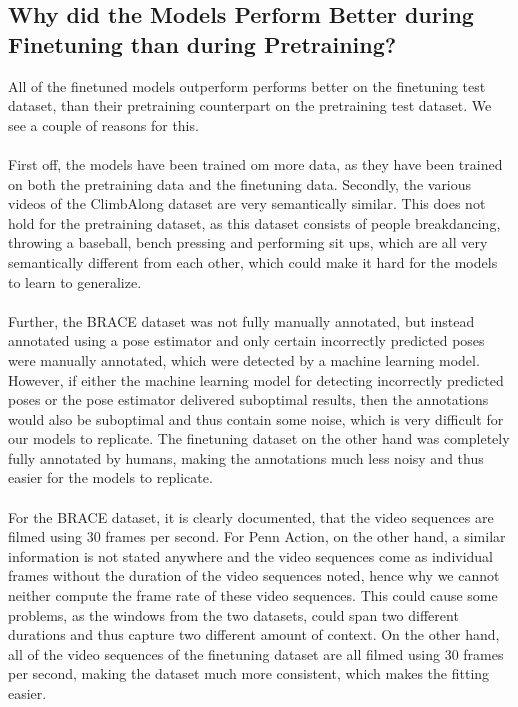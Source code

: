 \documentclass[./main.tex]{subfiles}
\begin{document}
\subsection{Why did the Models Perform Better during Finetuning than during Pretraining?}
\label{sec:pretrain_vs_finetune}
All of the finetuned models outperform performs better on the finetuning test dataset, than their pretraining counterpart on the pretraining test dataset. We see a couple of reasons for this. 
\\
\\
First off, the models have been trained om more data, as they have been trained on both the pretraining data and the finetuning data. Secondly, the various videos of the ClimbAlong dataset are very semantically similar. This does not hold for the pretraining dataset, as this dataset consists of people breakdancing, throwing a baseball, bench pressing and performing sit ups, which are all very semantically different from each other, which could make it hard for the models to learn to generalize.
\\
\\
Further, the BRACE dataset was not fully manually annotated, but instead annotated using a pose estimator and only certain incorrectly predicted poses were manually annotated, which were detected by a machine learning model. However, if either the machine learning model for detecting incorrectly predicted poses or the pose estimator delivered suboptimal results, then the annotations would also be suboptimal and thus contain some noise, which is very difficult for our models to replicate. The finetuning dataset on the other hand was completely fully annotated by humans, making the annotations much less noisy and thus easier for the models to replicate.
\\
\\
For the BRACE dataset, it is clearly documented, that the video sequences are filmed using 30 frames per second. For Penn Action, on the other hand, a similar information is not stated anywhere and the video sequences come as individual frames without the duration of the video sequences noted, hence why we cannot neither compute the frame rate of these video sequences. This could cause some problems, as the windows from the two datasets, could span two different durations and thus capture two different amount of context. On the other hand, all of the video sequences of the finetuning dataset are all filmed using 30 frames per second, making the dataset much more consistent, which makes the fitting easier.
\end{document}
